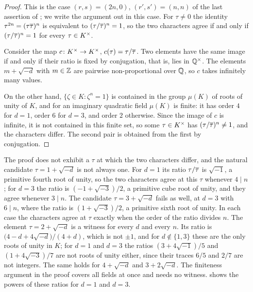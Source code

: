 \begin{proof}
This is the case $(r,s)=(2n,0)$, $(r',s')=(n,n)$ of the last assertion of
; we write the argument out in this case. For $\tau\ne0$
the identity $\tau^{2n}=(\tau\overline{\tau})^{n}$ is equivalent to
$(\tau/\overline{\tau})^{n}=1$, so the two characters agree if and only if
$(\tau/\overline{\tau})^{n}=1$ for every $\tau\in K^{\times}$.

Consider the map $c\colon K^{\times}\to K^{\times}$, $c(\tau)=\tau/\overline{\tau}$. Two elements
have the same image if and only if their ratio is fixed by conjugation, that
is, lies in $\mathbb{Q}^{\times}$. The elements $m+\sqrt{-d}$ with $m\in\mathbb{Z}$ are
pairwise non-proportional over $\mathbb{Q}$, so $c$ takes infinitely many values.

On the other hand, $\{\zeta\in K:\zeta^{n}=1\}$ is contained in the group
$\mu(K)$ of roots of unity of $K$, and for an imaginary quadratic field
$\mu(K)$ is finite: it has order $4$ for $d=1$, order $6$ for $d=3$, and order
$2$ otherwise. Since the image of $c$ is infinite, it is not contained in this
finite set, so some $\tau\in K^{\times}$ has $(\tau/\overline{\tau})^{n}\ne1$, and the
characters differ. The second pair is obtained from the first by conjugation.
\end{proof}

\begin{remark}\label{rem:witness}
The proof does not exhibit a $\tau$ at which the two characters differ, and
the natural candidate $\tau=1+\sqrt{-d}$ is not always one. For $d=1$ its
ratio $\tau/\overline{\tau}$ is $\sqrt{-1}$, a primitive fourth root of unity, so
the two characters agree at this $\tau$ whenever $4\mid n$; for $d=3$ the
ratio is $(-1+\sqrt{-3})/2$, a primitive cube root of unity, and they agree
whenever $3\mid n$. The candidate $\tau=3+\sqrt{-d}$ fails as well, at $d=3$
with $6\mid n$, where the ratio is $(1+\sqrt{-3})/2$, a primitive sixth root of
unity. In each case the characters agree at $\tau$ exactly when the order of
the ratio divides $n$. The element $\tau=2+\sqrt{-d}$ is a witness for every $d$
and every $n$. Its ratio is $\bigl(4-d+4\sqrt{-d}\bigr)/(4+d)$, which is not
$\pm1$, and for $d\notin\{1,3\}$ these are the only roots of unity in $K$;
for $d=1$ and $d=3$ the ratios $(3+4\sqrt{-1})/5$ and $(1+4\sqrt{-3})/7$ are
not roots of unity either, since their traces $6/5$ and $2/7$ are not
integers. The same holds for $4+\sqrt{-d}$ and $3+2\sqrt{-d}$. The finiteness
argument in the proof covers all fields at once and needs no witness.  shows the powers of these ratios for $d=1$ and $d=3$.
\end{remark}

